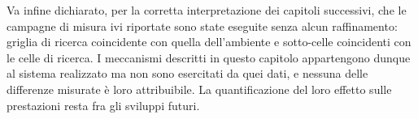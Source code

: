 Va infine dichiarato, per la corretta interpretazione dei capitoli successivi, che le campagne
di misura ivi riportate sono state eseguite senza alcun raffinamento: griglia di ricerca
coincidente con quella dell'ambiente e sotto-celle coincidenti con le celle di ricerca. I
meccanismi descritti in questo capitolo appartengono dunque al sistema realizzato ma non sono
esercitati da quei dati, e nessuna delle differenze misurate è loro attribuibile. La
quantificazione del loro effetto sulle prestazioni resta fra gli sviluppi futuri.
